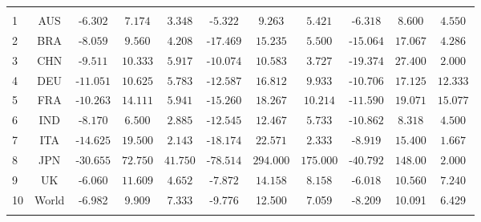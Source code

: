 \begin{table}[!htbp]
\begin{adjustbox}{width=\textwidth}
\begin{tabular}{@{\extracolsep{5pt}} Hcccccccccc}
	\hline \\[-1.8ex] 
	1 & AUS & -$6.302$ & $7.174$ & $3.348$ & -$5.322$ & $9.263$ & $5.421$ & -$6.318$ & $8.600$ & $4.550$ \\ 
	2 & BRA & -$8.059$ & $9.560$ & $4.208$ & -$17.469$ & $15.235$ & $5.500$ & -$15.064$ & $17.067$ & $4.286$ \\ 
	3 & CHN & -$9.511$ & $10.333$ & $5.917$ & -$10.074$ & $10.583$ & $3.727$ & -$19.374$ & $27.400$ & $2.000$ \\ 
	4 & DEU & -$11.051$ & $10.625$ & $5.783$ & -$12.587$ & $16.812$ & $9.933$ & -$10.706$ & $17.125$ & $12.333$ \\ 
	5 & FRA & -$10.263$ & $14.111$ & $5.941$ & -$15.260$ & $18.267$ & $10.214$ & -$11.590$ & $19.071$ & $15.077$ \\ 
	6 & IND & -$8.170$ & $6.500$ & $2.885$ & -$12.545$ & $12.467$ & $5.733$ & -$10.862$ & $8.318$ & $4.500$ \\ 
	7 & ITA & -$14.625$ & $19.500$ & $2.143$ & -$18.174$ & $22.571$ & $2.333$ & -$8.919$ & $15.400$ & $1.667$ \\ 
	8 & JPN & -$30.655$ & $72.750$ & $41.750$ & -$78.514$ & $294.000$ & $175.000$ & -$40.792$ & $148.00$ & $2.000$ \\ 
	9 & UK & -$6.060$ & $11.609$ & $4.652$ & -$7.872$ & $14.158$ & $8.158$ & -$6.018$ & $10.560$ & $7.240$ \\ 
	10 & World & -6.982   &   9.909  &      7.333& -9.776   &    12.500    &    7.059 &-8.209&10.091 &       6.429\\
	\hline \\[-1.8ex] 
\end{tabular}
	\end{adjustbox} 
\end{table} 